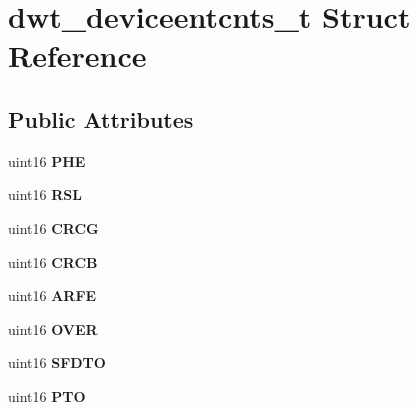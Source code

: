 \hypertarget{structdwt__deviceentcnts__t}{\section{dwt\-\_\-deviceentcnts\-\_\-t Struct Reference}
\label{structdwt__deviceentcnts__t}
}
\subsection*{Public Attributes}
\begin{DoxyCompactItemize}
\item 
\hypertarget{structdwt__deviceentcnts__t_ab5842011f49741ddfec0aa2861c3bac2}{uint16 {\bfseries P\-H\-E}}\label{structdwt__deviceentcnts__t_ab5842011f49741ddfec0aa2861c3bac2}

\item 
\hypertarget{structdwt__deviceentcnts__t_a3a3926e1adf4bdba000346778772d2c5}{uint16 {\bfseries R\-S\-L}}\label{structdwt__deviceentcnts__t_a3a3926e1adf4bdba000346778772d2c5}

\item 
\hypertarget{structdwt__deviceentcnts__t_ad1c1b448eb9c1dea3892e5731723cbfb}{uint16 {\bfseries C\-R\-C\-G}}\label{structdwt__deviceentcnts__t_ad1c1b448eb9c1dea3892e5731723cbfb}

\item 
\hypertarget{structdwt__deviceentcnts__t_a9cdb6adc5323cf15190e61b1faebd5c5}{uint16 {\bfseries C\-R\-C\-B}}\label{structdwt__deviceentcnts__t_a9cdb6adc5323cf15190e61b1faebd5c5}

\item 
\hypertarget{structdwt__deviceentcnts__t_aaa2431fe69e8ae2351998a11c241a310}{uint16 {\bfseries A\-R\-F\-E}}\label{structdwt__deviceentcnts__t_aaa2431fe69e8ae2351998a11c241a310}

\item 
\hypertarget{structdwt__deviceentcnts__t_a0cea2294c9158996d6549a2ee650e238}{uint16 {\bfseries O\-V\-E\-R}}\label{structdwt__deviceentcnts__t_a0cea2294c9158996d6549a2ee650e238}

\item 
\hypertarget{structdwt__deviceentcnts__t_a3449072bb8204cfdbd67375d284b1d97}{uint16 {\bfseries S\-F\-D\-T\-O}}\label{structdwt__deviceentcnts__t_a3449072bb8204cfdbd67375d284b1d97}

\item 
\hypertarget{structdwt__deviceentcnts__t_a85932e18859aea879c2eb395e004bd6a}{uint16 {\bfseries P\-T\-O}}\label{structdwt__deviceentcnts__t_a85932e18859aea879c2eb395e004bd6a}


\end{DoxyCompactItemize}
